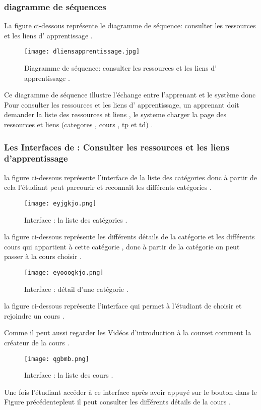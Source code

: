 \subsubsection{diagramme de séquences }
La figure  ci-dessous représente le diagramme de séquence: consulter les ressources et les liens d' apprentissage .

\begin{figure}[ht]
	\centering
	\texttt{[image: dliensapprentissage.jpg]}
	\caption{Diagramme de séquence: consulter les ressources et les liens d' apprentissage .}
	\label{fig:diagramme de séquence: consulter les ressources et les liens d' apprentissage }
\end{figure}
\FloatBarrier

Ce diagramme de séquence illustre l’échange entre l'apprenant et le système  donc Pour consulter les ressources et les liens d' apprentissage, un apprenant doit demander la liste des ressources et liens , le systeme charger la page des ressources et liens  (categores , cours , tp et td) .


\subsubsection{Les Interfaces de : Consulter les ressources et les liens d'apprentissage  }

la figure ci-dessous représente l'interface de la liste des catégories donc à partir de cela l'étudiant peut  parcourir et reconnaît les différents catégories .
\begin{figure}[ht]
	\centering
	\texttt{[image: eyjgkjo.png]}
	\caption{Interface : la liste des catégories .}
	\label{fig:Interface : la liste des catégories }
\end{figure}
\FloatBarrier
\bigskip
\bigskip
\bigskip
la figure ci-dessous représente les différents détails de la catégorie et les différents cours qui appartient à cette catégorie  , donc à partir de la catégorie on peut passer à la cours choisir .
\begin{figure}[ht]
	\centering
	\texttt{[image: eyooogkjo.png]}
	\caption{Interface : détail d'une catégorie .}
	\label{fig:Interface : détail d'une catégorie }
\end{figure}
\FloatBarrier
\clearpage
la figure ci-dessous représente l'interface qui permet à l'étudiant de choisir et rejoindre un cours .

\medskip

Comme  il peut aussi regarder les Vidéos d'introduction à la courset comment la créateur de la cours .
\bigskip
\bigskip
\bigskip
\begin{figure}[ht]
	\centering
	\texttt{[image: qgbmb.png]}
	\caption{Interface : la liste des cours .}
	\label{fig:Interface : la liste des cours }
\end{figure}
\FloatBarrier
\bigskip
\bigskip
\bigskip
Une fois l'étudiant accéder  à ce interface  après avoir appuyé sur le bouton dans le Figure précédentepleut il peut consulter les différents détails de la cours .

